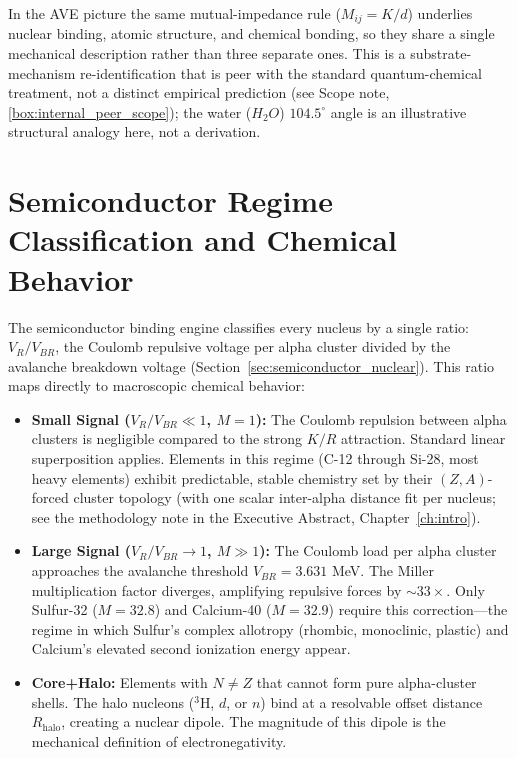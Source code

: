 In the AVE picture the same mutual-impedance rule ($M_{ij} = K/d$) underlies nuclear binding, atomic structure, and chemical bonding, so they share a single mechanical description rather than three separate ones. This is a substrate-mechanism re-identification that is peer with the standard quantum-chemical treatment, not a distinct empirical prediction (see Scope note, \ref{box:internal_peer_scope}); the water ($H_2O$) $104.5^\circ$ angle is an illustrative structural analogy here, not a derivation.

\section{Semiconductor Regime Classification and Chemical Behavior}
The semiconductor binding engine classifies every nucleus by a single ratio: $V_R/V_{BR}$, the Coulomb repulsive voltage per alpha cluster divided by the avalanche breakdown voltage (Section~\ref{sec:semiconductor_nuclear}). This ratio maps directly to macroscopic chemical behavior:

\begin{itemize}
    \item \textbf{Small Signal ($V_R/V_{BR} \ll 1$, $M = 1$):} The Coulomb repulsion between alpha clusters is negligible compared to the strong $K/R$ attraction. Standard linear superposition applies. Elements in this regime (C-12 through Si-28, most heavy elements) exhibit predictable, stable chemistry set by their $(Z,A)$-forced cluster topology (with one scalar inter-alpha distance fit per nucleus; see the methodology note in the Executive Abstract, Chapter~\ref{ch:intro}).
    \item \textbf{Large Signal ($V_R/V_{BR} \to 1$, $M \gg 1$):} The Coulomb load per alpha cluster approaches the avalanche threshold $V_{BR} = 3.631$ MeV. The Miller multiplication factor diverges, amplifying repulsive forces by $\sim 33\times$. Only Sulfur-32 ($M = 32.8$) and Calcium-40 ($M = 32.9$) require this correction---the regime in which Sulfur's complex allotropy (rhombic, monoclinic, plastic) and Calcium's elevated second ionization energy appear.
    \item \textbf{Core+Halo:} Elements with $N \neq Z$ that cannot form pure alpha-cluster shells. The halo nucleons ($^3$H, $d$, or $n$) bind at a resolvable offset distance $R_{\text{halo}}$, creating a nuclear dipole. The magnitude of this dipole is the mechanical definition of electronegativity.
\end{itemize}

